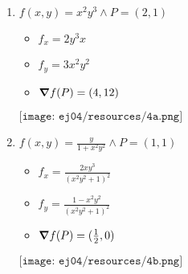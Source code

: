 \documentclass[../practica_04.tex]{subfiles}
\begin{document}
    \begin{enumerate}
        \item $f(x,y) = x^2y^3 \wedge P = (2,1)$
            \begin{itemize}
                \item $ f_x = 2y^3x $
                \item $ f_y = 3x^2y^2 $
                \item $ \gradient{f(P)} = (4,12) $
            \end{itemize}

            $ \texttt{[image: ej04/resources/4a.png]}  $

        \item $f(x,y) = \frac{y}{1+x^2y^2} \wedge P = (1,1)$
            \begin{itemize}
                \item $ f_x = \frac{2xy^3}{(x^2y^2+1)^2} $
                \item $ f_y = \frac{1-x^2y^2}{(x^2y^2+1)^2} $
                \item $ \gradient{f(P)} = (\frac{1}{2},0)$
            \end{itemize}

            $ \texttt{[image: ej04/resources/4b.png]}  $
    \end{enumerate}
\end{document}
